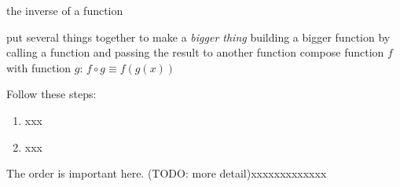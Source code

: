 \documentclass[fleqn,letterpaper,12pt,printwatermark=true]{memoir}
\begin{document}
\newcommand{\myClassName}{Pre-AP Algebra 2}
\newcommand{\myUnitNumber}{1}
\newcommand{\myUnitTitle}{Introduction to Functions}
\newcommand{\myLessonNumber}{8}
\newcommand{\myLessonTitle}{Composing Functions}



\pagestyle{myPagestyle}

\checkandfixthelayout
{}

\begin{myNotesHeader}
    \item {} the inverse of a function
\end{myNotesHeader}

\begin{myVocabulary}
        {
            put several things together to make a \emph{bigger thing}
        }
        {
            building a bigger function by calling a function and passing the result to another function
        }
        {
            compose function $f$ with function $g$: $f \circ g \equiv f(g(x))$
        }
\end{myVocabulary}

\begin{myKeyConcepts}
    Follow these steps:
    \begin{enumerate}
        \item xxx
        \item xxx
    \end{enumerate}
    The order is important here. (TODO: more detail)xxxxxxxxxxxxx
\end{myKeyConcepts}



  
\end{document}
